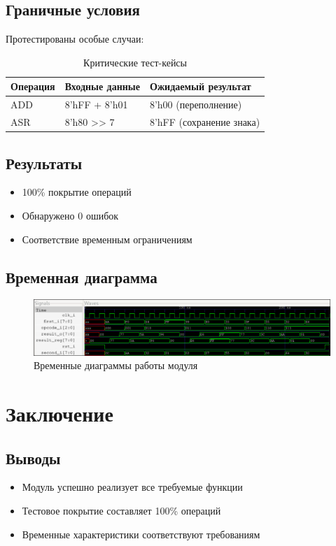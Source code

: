 \documentclass[a4paper,12pt]{article}
\begin{document}
\subsection{Граничные условия}
Протестированы особые случаи:

\begin{table}[h]
\centering
\caption{Критические тест-кейсы}
\begin{tabular}{|l|l|l|}
\hline
\textbf{Операция} & \textbf{Входные данные} & \textbf{Ожидаемый результат} \\ \hline
ADD & 8'hFF + 8'h01 & 8'h00 (переполнение) \\ \hline
ASR & 8'h80 >> 7 & 8'hFF (сохранение знака) \\ \hline
\end{tabular}
\end{table}

\subsection{Результаты}
\begin{itemize}
    \item 100\% покрытие операций
    \item Обнаружено 0 ошибок
    \item Соответствие временным ограничениям
\end{itemize}

\subsection{Временная диаграмма}
\begin{figure}[h]
\centering
\includegraphics[width=\textwidth]{pictures/waveform.png}
\caption{Временные диаграммы работы модуля}
\label{fig:waveform}
\end{figure}

\section{Заключение}
\subsection{Выводы}
\begin{itemize}
    \item Модуль успешно реализует все требуемые функции
    \item Тестовое покрытие составляет 100\% операций
    \item Временные характеристики соответствуют требованиям
\end{itemize}
\end{document}
